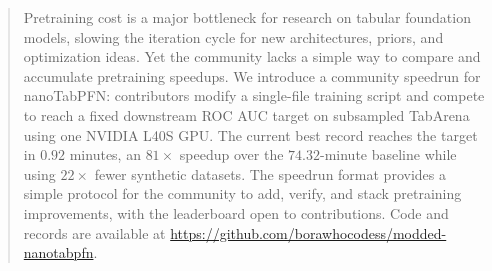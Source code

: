\documentclass{article}
\theoremstyle{plain}
\theoremstyle{definition}
\theoremstyle{remark}
\begin{document}

\printAffiliationsAndNotice{}

\begin{abstract}
  Pretraining cost is a major bottleneck for research on tabular foundation models, slowing the iteration cycle for new architectures, priors, and optimization ideas.
  Yet the community lacks a simple way to compare and accumulate pretraining speedups.
  We introduce a community speedrun for nanoTabPFN: contributors modify a single-file training script and compete to reach a fixed downstream ROC AUC target on subsampled TabArena using one NVIDIA L40S GPU.
  The current best record reaches the target in $0.92$ minutes, an $81\times$ speedup over the $74.32$-minute baseline while using $22\times$ fewer synthetic datasets.
  The speedrun format provides a simple protocol for the community to add, verify, and stack pretraining improvements, with the leaderboard open to contributions.
  Code and records are available at \url{https://github.com/borawhocodess/modded-nanotabpfn}.
\end{abstract}

\end{document}
